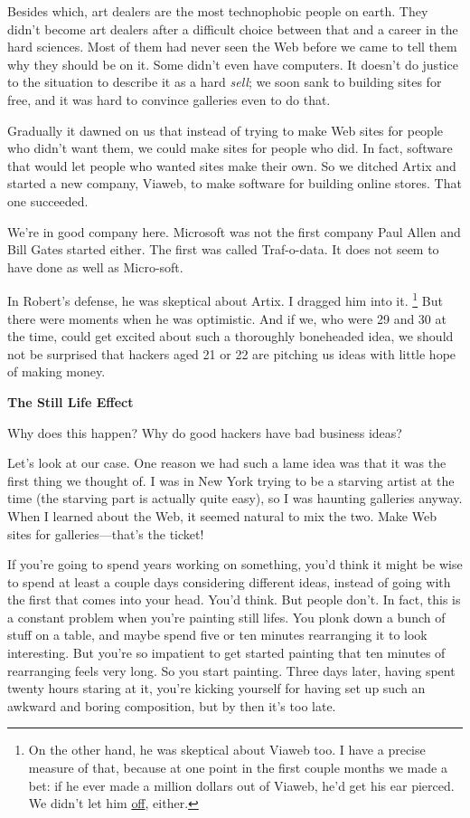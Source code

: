 \documentclass[12pt]{book}
\begin{document}
Besides which, art dealers are the most technophobic people on earth.
They didn't become art dealers after a difficult choice between that and
a career in the hard sciences. Most of them had never seen the Web
before we came to tell them why they should be on it. Some didn't even
have computers. It doesn't do justice to the situation to describe it as
a hard \emph{sell}; we soon sank to building sites for free, and it was
hard to convince galleries even to do that.

Gradually it dawned on us that instead of trying to make Web sites for
people who didn't want them, we could make sites for people who did. In
fact, software that would let people who wanted sites make their own. So
we ditched Artix and started a new company, Viaweb, to make software for
building online stores. That one succeeded.

We're in good company here. Microsoft was not the first company Paul
Allen and Bill Gates started either. The first was called Traf-o-data.
It does not seem to have done as well as Micro-soft.

In Robert's defense, he was skeptical about Artix. I dragged him into
it. \footnote{On the other hand, he was skeptical about Viaweb too. I have a
precise measure of that, because at one point in the first couple months
we made a bet: if he ever made a million dollars out of Viaweb, he'd get
his ear pierced. We didn't let him \href{pierced.html}{off}, either.} But there were moments when he was
optimistic. And if we, who were 29 and 30 at the time, could get excited
about such a thoroughly boneheaded idea, we should not be surprised that
hackers aged 21 or 22 are pitching us ideas with little hope of making
money.

\textbf{The Still Life Effect}

Why does this happen? Why do good hackers have bad business ideas?

Let's look at our case. One reason we had such a lame idea was that it
was the first thing we thought of. I was in New York trying to be a
starving artist at the time (the starving part is actually quite easy),
so I was haunting galleries anyway. When I learned about the Web, it
seemed natural to mix the two. Make Web sites for galleries---that's the
ticket!

If you're going to spend years working on something, you'd think it
might be wise to spend at least a couple days considering different
ideas, instead of going with the first that comes into your head. You'd
think. But people don't. In fact, this is a constant problem when you're
painting still lifes. You plonk down a bunch of stuff on a table, and
maybe spend five or ten minutes rearranging it to look interesting. But
you're so impatient to get started painting that ten minutes of
rearranging feels very long. So you start painting. Three days later,
having spent twenty hours staring at it, you're kicking yourself for
having set up such an awkward and boring composition, but by then it's
too late.
\end{document}

